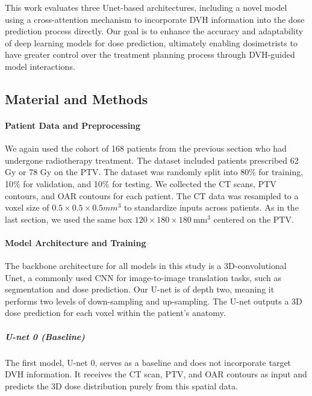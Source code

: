 This work evaluates three Unet-based architectures, including a novel model using a cross-attention mechanism to incorporate DVH information into the dose prediction process directly.
Our goal is to enhance the accuracy and adaptability of deep learning models for dose prediction, ultimately enabling dosimetrists to have greater control over the treatment planning process through DVH-guided model interactions.

\subsection{Material and Methods}
\paragraph{Patient Data and Preprocessing}
We again used the cohort of 168 patients from the previous section who had undergone radiotherapy treatment.
The dataset included patients prescribed 62 Gy or 78 Gy on the PTV.
The dataset was randomly split into 80\% for training, 10\% for validation, and 10\% for testing.
We collected the CT scans, PTV contours, and OAR contours for each patient.
The CT data was resampled to a voxel size of $0.5 \times 0.5 \times 0.5 \textit{mm}^3$ to standardize inputs across patients.
As in the last section, we used the same box $120 \times 180 \times 180\ \text{mm}^3$ centered on the PTV.

\paragraph{Model Architecture and Training}
The backbone architecture for all models in this study is a 3D-convolutional Unet, a commonly used CNN for image-to-image translation tasks, such as segmentation and dose prediction.
Our U-net is of depth two, meaning it performs two levels of down-sampling and up-sampling.
The U-net outputs a 3D dose prediction for each voxel within the patient's anatomy.

\subparagraph{U-net 0 (Baseline)}
The first model, U-net 0, serves as a baseline and does not incorporate target DVH information.
It receives the CT scan, PTV, and OAR contours as input and predicts the 3D dose distribution purely from this spatial data.


